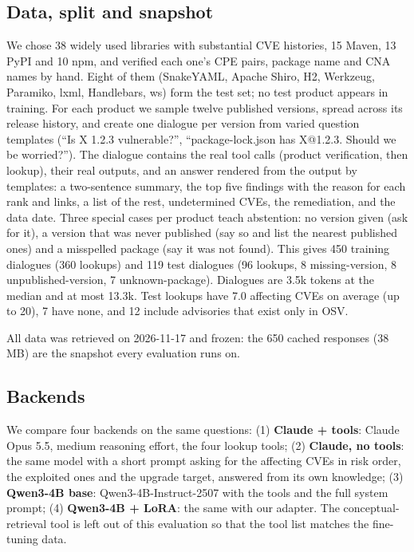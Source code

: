 \documentclass[final]{cvpr}
\begin{document}
\subsection{Data, split and snapshot}
\label{sec:data}
We chose 38 widely used libraries with substantial CVE histories, 15 Maven, 13 PyPI and 10 npm, and verified each one's CPE pairs, package name and CNA names by hand. Eight of them (SnakeYAML, Apache Shiro, H2, Werkzeug, Paramiko, lxml, Handlebars, ws) form the test set; no test product appears in training. For each product we sample twelve published versions, spread across its release history, and create one dialogue per version from varied question templates (``Is X 1.2.3 vulnerable?'', ``package-lock.json has X@1.2.3. Should we be worried?''). The dialogue contains the real tool calls (product verification, then lookup), their real outputs, and an answer rendered from the output by templates: a two-sentence summary, the top five findings with the reason for each rank and links, a list of the rest, undetermined CVEs, the remediation, and the data date. Three special cases per product teach abstention: no version given (ask for it), a version that was never published (say so and list the nearest published ones) and a misspelled package (say it was not found). This gives 450 training dialogues (360 lookups) and 119 test dialogues (96 lookups, 8 missing-version, 8 unpublished-version, 7 unknown-package). Dialogues are 3.5k tokens at the median and at most 13.3k. Test lookups have 7.0 affecting CVEs on average (up to 20), 7 have none, and 12 include advisories that exist only in OSV.

All data was retrieved on 2026-11-17 and frozen: the 650 cached responses (38\,MB) are the snapshot every evaluation runs on.

\subsection{Backends}
We compare four backends on the same questions:
(1) \textbf{Claude + tools}: Claude Opus 5.5, medium reasoning effort, the four lookup tools;
(2) \textbf{Claude, no tools}: the same model with a short prompt asking for the affecting CVEs in risk order, the exploited ones and the upgrade target, answered from its own knowledge;
(3) \textbf{Qwen3-4B base}: Qwen3-4B-Instruct-2507 with the tools and the full system prompt;
(4) \textbf{Qwen3-4B + LoRA}: the same with our adapter.
The conceptual-retrieval tool is left out of this evaluation so that the tool list matches the fine-tuning data.
\end{document}
